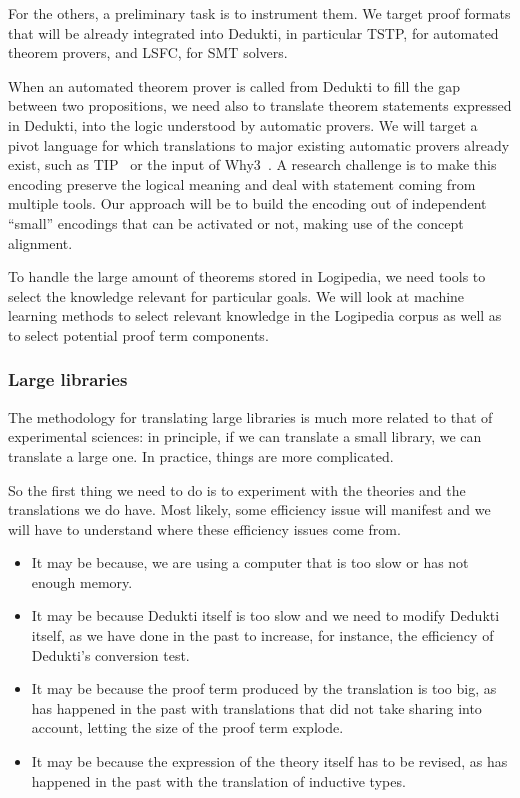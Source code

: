 For the others, a preliminary task is to instrument them.  We target
proof formats that will be already integrated into Dedukti, in
particular TSTP, for automated theorem provers, and LSFC, for SMT solvers.

When an automated theorem prover is called from Dedukti to fill the
gap between two propositions, we need also to translate theorem
statements expressed in Dedukti, into the logic understood by
automatic provers. We will target a pivot language for which
translations to major existing automatic provers already exist, such
as TIP~\cite{DBLP:conf/mkm/ClaessenJRS15} or the input of
Why3~\cite{DBLP:conf/esop/FilliatreP13}. A research challenge is to
make this encoding preserve the logical meaning and deal with
statement coming from multiple tools. Our approach will be to build
the encoding out of independent ``small'' encodings that can be
activated or not, making use of the concept alignment.

To handle the large amount of theorems stored in Logipedia, we need
tools to select the knowledge relevant for particular goals. We will
look at machine learning methods to select relevant knowledge in the
Logipedia corpus as well as to select potential proof term components.

\subsubsection*{Large libraries}

The methodology for translating large libraries is much more related
to that of experimental sciences: in principle, if we can translate a
small library, we can translate a large one. In practice, things are
more complicated.

So the first thing we need to do is to experiment with the theories
and the translations we do have. Most likely, some efficiency issue
will manifest and we will have to understand where these efficiency
issues come from.

\begin{itemize}
\item It may be because, we are using a computer that is too slow or
  has not enough memory.
\item It may be because Dedukti itself is too slow and we need to modify
  Dedukti itself, as we have done in the past to increase, for instance,
  the efficiency of Dedukti's conversion test.
\item It may be because the proof term produced by the translation is
  too big, as has happened in the past with translations that did not
  take sharing into account, letting the size of the proof term explode.
\item It may be because the expression of the theory itself has to be
  revised, as has happened in the past with the translation of
  inductive types.
\end{itemize}

